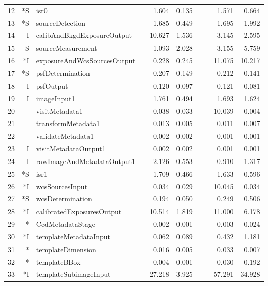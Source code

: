 \begin{table}[htbp]
\begin{center}
\begin{tabular}{lrlcrrc|crr}
12 & *S &                          isr0 &&  1.604 &  0.135 &&&  1.571 &  0.664 \\  %
13 & *S &               sourceDetection &&  1.685 &  0.449 &&&  1.695 &  1.992 \\  %
14 &  I &    calibAndBkgdExposureOutput && 10.627 &  1.536 &&&  3.145 &  2.595 \\
15 &  S &             sourceMeasurement &&  1.093 &  2.028 &&&  3.155 &  5.759 \\  %
16 & *I &   exposureAndWcsSourcesOutput &&  0.228 &  0.245 &&& 11.075 & 10.217 \\
17 & *S &              psfDetermination &&  0.207 &  0.149 &&&  0.212 &  0.141 \\  %
18 &  I &                     psfOutput &&  0.120 &  0.097 &&&  0.121 &  0.081 \\
19 &  I &                   imageInput1 &&  1.761 &  0.494 &&&  1.693 &  1.624 \\
20 &    &                visitMetadata1 &&  0.038 &  0.033 &&& 10.039 &  0.004 \\
21 &    &            transformMetadata1 &&  0.013 &  0.005 &&&  0.011 &  0.007 \\
22 &    &             validateMetadata1 &&  0.002 &  0.002 &&&  0.001 &  0.001 \\
23 &  I &          visitMetadataOutput1 &&  0.002 &  0.002 &&&  0.001 &  0.001 \\
24 &  I &    rawImageAndMetadataOutput1 &&  2.126 &  0.553 &&&  0.910 &  1.317 \\
25 & *S &                          isr1 &&  1.709 &  0.466 &&&  1.633 &  0.596 \\  %
26 & *I &               wcsSourcesInput &&  0.034 &  0.029 &&& 10.045 &  0.034 \\
27 & *S &              wcsDetermination &&  0.194 &  0.050 &&&  0.249 &  0.506 \\  %
28 & *I &     calibratedExposuresOutput && 10.514 &  1.819 &&& 11.000 &  6.178 \\
29 & *  &              CcdMetadataStage &&  0.002 &  0.001 &&&  0.003 &  0.024 \\
30 & *I &         templateMetadataInput &&  0.062 &  0.089 &&&  0.432 &  1.181 \\
31 & *  &             templateDimension &&  0.016 &  0.005 &&&  0.033 &  0.007 \\
32 & *  &                  templateBBox &&  0.004 &  0.001 &&&  0.030 &  0.192 \\
33 & *I &         templateSubimageInput && 27.218 &  3.925 &&& 57.291 & 34.928 \\

\end{tabular}
\end{center}
\end{table}
